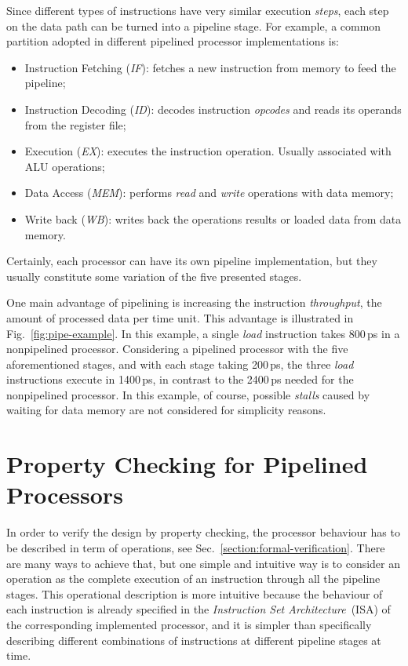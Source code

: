 Since different types of instructions have very similar execution \textit{steps}, each step on the data path can be turned into a pipeline stage. For example, a common partition adopted in different pipelined processor implementations is: 

\begin{itemize}
\item Instruction Fetching (\textit{IF}): fetches a new instruction from memory to feed the pipeline;
\item Instruction Decoding (\textit{ID}): decodes instruction \textit{opcodes} and reads its operands from the register file;
\item Execution (\textit{EX}): executes the instruction operation. Usually associated with ALU operations;
\item Data Access (\textit{MEM}): performs \textit{read} and \textit{write} operations with data memory;
\item Write back (\textit{WB}): writes back the operations results or loaded data from data memory.
\end{itemize}

Certainly, each processor can have its own pipeline implementation, but they usually constitute some variation of the five presented stages.

One main advantage of pipelining is increasing the instruction \textit{throughput}, the amount of processed data per time unit. This advantage is illustrated in Fig.~\ref{fig:pipe-example}. In this example, a single \textit{load} instruction takes 800\,ps in a nonpipelined processor. Considering a pipelined processor with the five aforementioned stages, and with each stage taking 200\,ps, the three \textit{load} instructions execute in 1400\,ps, in contrast to the 2400\,ps needed for the nonpipelined processor. In this example, of course, possible \textit{stalls} caused by waiting for data memory are not considered for simplicity reasons. 

\section{Property Checking for Pipelined Processors}
\label{section:ipc-pipe-processor}

In order to verify the design by property checking, the processor behaviour has to be described in term of operations, see Sec.~\ref{section:formal-verification}. There are many ways to achieve that, but one simple and intuitive way is to consider an operation as the complete execution of an instruction through all the pipeline stages. This operational description is more intuitive because the behaviour of each instruction is already specified in the \textit{Instruction Set Architecture}~(ISA) of the corresponding implemented processor, and it is simpler than specifically describing different combinations of instructions at different pipeline stages at time.

